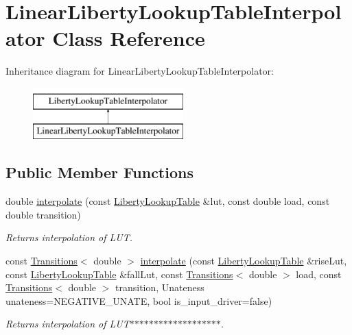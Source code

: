 \hypertarget{classLinearLibertyLookupTableInterpolator}{\section{Linear\-Liberty\-Lookup\-Table\-Interpolator Class Reference}
\label{classLinearLibertyLookupTableInterpolator}
}
Inheritance diagram for Linear\-Liberty\-Lookup\-Table\-Interpolator\-:\begin{figure}[H]
\begin{center}
\leavevmode
\includegraphics[height=2.000000cm]{classLinearLibertyLookupTableInterpolator}
\end{center}
\end{figure}
\subsection*{Public Member Functions}
\begin{DoxyCompactItemize}
\item 
double \hyperlink{classLinearLibertyLookupTableInterpolator_afd4bc7bfcf9e969478fbc9505b588bf3}{interpolate} (const \hyperlink{structLibertyLookupTable}{Liberty\-Lookup\-Table} \&lut, const double load, const double transition)
\begin{DoxyCompactList}\small\item\em Returns interpolation of L\-U\-T. \end{DoxyCompactList}\item 
const \hyperlink{classTransitions}{Transitions}$<$ double $>$ \hyperlink{classLinearLibertyLookupTableInterpolator_a9b0f96185327e7cb0e5c315691eb6579}{interpolate} (const \hyperlink{structLibertyLookupTable}{Liberty\-Lookup\-Table} \&rise\-Lut, const \hyperlink{structLibertyLookupTable}{Liberty\-Lookup\-Table} \&fall\-Lut, const \hyperlink{classTransitions}{Transitions}$<$ double $>$ load, const \hyperlink{classTransitions}{Transitions}$<$ double $>$ transition, Unateness unateness=N\-E\-G\-A\-T\-I\-V\-E\-\_\-\-U\-N\-A\-T\-E, bool is\-\_\-input\-\_\-driver=false)
\begin{DoxyCompactList}\small\item\em Returns interpolation of L\-U\-T$\ast$$\ast$$\ast$$\ast$$\ast$$\ast$$\ast$$\ast$$\ast$$\ast$$\ast$$\ast$$\ast$$\ast$$\ast$$\ast$$\ast$$\ast$$\ast$. \end{DoxyCompactList}\end{DoxyCompactItemize}
